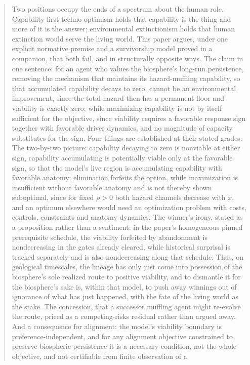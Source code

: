 \begin{abstract}
Two positions occupy the ends of a spectrum about the human role.
Capability-first techno-optimism holds that capability is the thing and
more of it is the answer; environmental extinctionism holds that human
extinction would serve the living world. This paper argues, under one
explicit normative premise and a survivorship model proved in a
companion, that both fail, and in structurally opposite ways. The claim
in one sentence: for an agent who values the biosphere's long-run
persistence, removing the mechanism that maintains its hazard-muffling capability,
so that accumulated capability decays to zero, cannot be an
environmental improvement, since the total hazard then has a permanent
floor and viability is exactly zero; while maximizing capability is not by itself sufficient for the objective, since viability requires a favorable response sign together with favorable driver dynamics, and no magnitude of capacity substitutes for
the sign. Four things are established at their stated grades. The
two-by-two picture: capability decaying to zero is nonviable at either
sign, capability accumulating is potentially viable only at the
favorable sign, so that the model's live region is accumulating capability with favorable anatomy; elimination forfeits the option, while maximization is insufficient without favorable anatomy and is not thereby shown suboptimal, since for fixed $\rho > 0$ both hazard channels decrease with $x$, and an optimum elsewhere would need an optimization problem with costs, controls, constraints and anatomy dynamics. The winner's irony, stated as a proposition rather than a
sentiment: in the paper's homogeneous pinned prerequisite schedule, the
viability forfeited by abandonment is nondecreasing in the gates already
cleared, while historical surprisal is tracked separately and is also
nondecreasing along that schedule. Thus, on geological timescales, the
lineage has only just come into possession of the biosphere's sole
realized route to positive viability, and to dismantle it for the
biosphere's sake is, within that model, to push away winnings out of
ignorance of what has just happened, with the fate of the living world
as the stake. The concession, that a successor muffling agent might
re-evolve the route, priced as a competing-risks residual rather than
argued away. And a consequence for alignment: the model's viability boundary is
preference-independent, and for any alignment objective constrained to
preserve biospheric persistence it is a necessary condition, not the
whole objective, and not certifiable from finite observation of a

\end{abstract}
